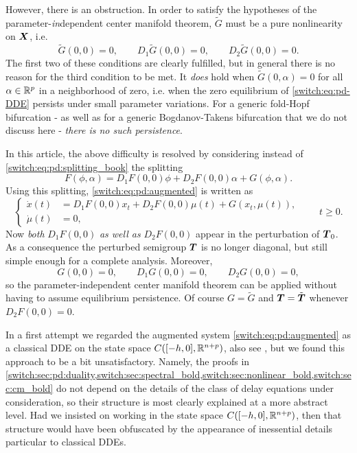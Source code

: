 However, there is an obstruction. In order to satisfy the hypotheses of the parameter-\emph{in}dependent center manifold theorem, $\tilde{G}$ must be a pure nonlinearity on $\boldsymbol{X}$, i.e.
\[
\tilde{G}(0,0) = 0, \qquad D_1\tilde{G}(0,0) = 0, \qquad D_2\tilde{G}(0,0) = 0.
\]
The first two of these conditions are clearly fulfilled, but in general there is no reason for the third condition to be met. It \emph{does} hold when $\tilde{G}(0,\alpha) = 0$ for all $\alpha \in \mathbb{R}^p$ in a neighborhood of zero, i.e. when the zero equilibrium of \cref{switch:eq:pd-DDE} persists under small parameter variations. For a generic fold-Hopf bifurcation - as well as for a generic Bogdanov-Takens bifurcation that we do not discuss here - \emph{there is no such persistence}.

In this article, the above difficulty is resolved by considering instead of \cref{switch:eq:pd:splitting_book} the splitting
\begin{equation}
  \label{switch:eq:pd:splitting}
  F(\phi,\alpha) = D_1F(0,0)\phi + D_2F(0,0)\alpha + G(\phi,\alpha).
\end{equation}
Using this splitting, \cref{switch:eq:pd:augmented} is written as
\begin{equation}
  \label{switch:eq:pd-DDE12}
  \left\{
    \begin{aligned}
      \dot{x}(t) &= D_1F(0,0)x_t + D_2F(0,0)\mu(t) + G(x_t, \mu(t)),\\
      \dot{\mu}(t) &= 0,
    \end{aligned}
  \right.
  \qquad t \ge 0.
\end{equation}
Now \emph{both} $D_1F(0,0)$ \emph{as well as} $D_2F(0,0)$ appear in the perturbation of $\boldsymbol{T}_0$. As a consequence the perturbed semigroup $\boldsymbol{T}$ is no longer diagonal, but still simple enough for a complete analysis. Moreover,
\begin{equation}
  \label{switch:eq:G_conditions}
  G(0,0) = 0, \qquad D_1G(0,0) = 0, \qquad D_2G(0,0) = 0,
\end{equation}
so the  parameter-independent center manifold theorem can be applied without having to assume equilibrium persistence. Of course $G = \tilde{G}$ and $\boldsymbol{T} = \tilde{\boldsymbol{T}}$ whenever $D_2F(0,0) = 0$.

\begin{remark}\label{switch:rem:more_general}
 In a first attempt we regarded the augmented system \cref{switch:eq:pd:augmented} as a classical DDE on the state space $C([-h,0], \mathbb{R}^{n + p})$, also see \textup{\cite{GuoMan2011parCM}}, but we found this approach to be a bit unsatisfactory. Namely, the proofs in \cref{switch:sec:pd:duality,switch:sec:spectral_bold,switch:sec:nonlinear_bold,switch:sec:cm_bold} do not depend on the details of the class of delay equations under consideration, so their structure is most clearly explained at a more abstract level. Had we insisted on working in the state space $C([-h,0], \mathbb{R}^{n + p})$, then that structure would have been obfuscated by the appearance of inessential details particular to classical DDEs. 
\end{remark}

